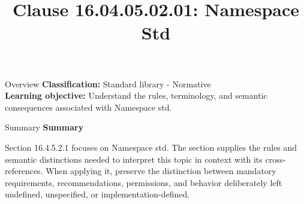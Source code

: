 \documentclass[10pt,letterpaper]{article}
\title{Clause 16.04.05.02.01: Namespace Std}
\author{}
\date{}
\begin{document}
\maketitle
\begin{CornellOverviewBox}{Overview}
\textbf{Classification:} Standard library - Normative\\[2pt]
\textbf{Learning objective:} Understand the rules, terminology, and semantic consequences associated with Namespace std.
\end{CornellOverviewBox}\begin{CornellSummaryBox}{Summary}
{\sffamily\bfseries\color{Accent} Summary}\par\vspace{3pt}Section 16.4.5.2.1 focuses on Namespace std. The section supplies the rules and semantic distinctions needed to interpret this topic in context with its cross-references. When applying it, preserve the distinction between mandatory requirements, recommendations, permissions, and behavior deliberately left undefined, unspecified, or implementation-defined.
\end{CornellSummaryBox}
\end{document}
